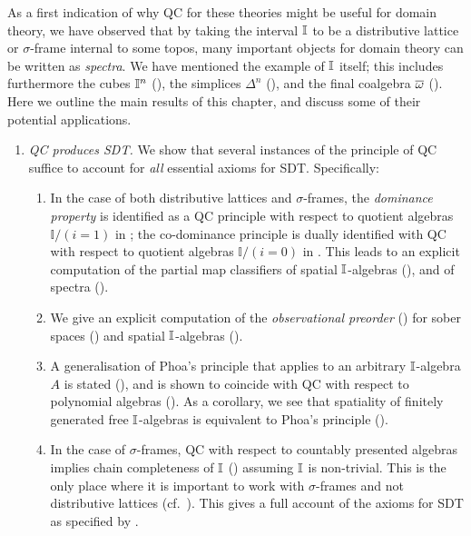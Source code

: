 As a first indication of why \gls{QC} for these theories might be useful for domain theory, we have observed that by taking the interval $\mathbb{I}$ to be a distributive lattice or $\sigma$-frame internal to some topos, many important objects for domain theory can be written as \emph{spectra}. We have mentioned the example of $\mathbb{I}$ itself; this includes furthermore the cubes $\mathbb{I}^n$ (), the simplices $\Delta^n$ (), and the final coalgebra $\overline{\omega}$ (). Here we outline the main results of this chapter, and discuss some of their potential applications.

\begin{enumerate}[leftmargin=*]
  \item \emph{\gls{QC} produces \gls{SDT}.} We show that several instances of the principle of \gls{QC} suffice to account for \emph{all} essential axioms for \gls{SDT}. Specifically:
  \begin{enumerate}
    \item\label{contribution:dominance} In the case of both distributive lattices and $\sigma$-frames, the \emph{dominance property} is identified as a \gls{QC} principle with respect to quotient algebras $\mathbb{I}/(i=1)$ in ; the co-dominance principle is dually identified with \gls{QC} with respect to quotient algebras $\mathbb{I}/(i=0)$ in . This leads to an explicit computation of the partial map classifiers of spatial $\mathbb{I}$-algebras (), and of spectra ().
    \item We give an explicit computation of the \emph{observational preorder} () for sober spaces () and spatial $\mathbb{I}$-algebras ().
    \item A generalisation of Phoa's principle that applies to an arbitrary $\mathbb{I}$-algebra $A$ is stated (), and is shown to coincide with \gls{QC} with respect to polynomial algebras (). As a corollary, we see that spatiality of finitely generated free $\mathbb{I}$-algebras is equivalent to Phoa's principle ().
    \item In the case of $\sigma$-frames, \gls{QC} with respect to countably presented algebras implies chain completeness of $\mathbb{I}$ () assuming $\mathbb{I}$ is non-trivial. This is the only place where it is important to work with $\sigma$-frames and not distributive lattices (cf.~). This gives a full account of the axioms for \gls{SDT} as specified by \citet{hyland_first_2006}. 
  \end{enumerate}


\end{enumerate}
